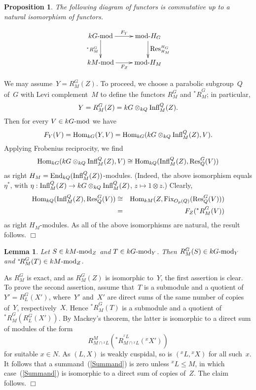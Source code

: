 \documentclass[twoside,12pt]{amsart}
\theoremstyle{plain}
\newenvironment{prf}{{\bf Proof.}}{\hfill $\Box$ \\[-1.0ex]}
\newtheorem{lem}[num]{Lemma}
\newtheorem{prp}[num]{Proposition}
\begin{document}
\begin{prp}
\label{HCRestricitonAndRestriction}
The following diagram of functors is commutative up to a natural
isomorphism of functors.

$$
\begin{xy}
\xymatrix{
kG\mbox{\rm -mod} \ar[r]^{F_Y} \ar[d]_{{^*R}_M^G} & \mbox{\rm mod-}H_G \ar[d]^{{\mbox{\rm Res}}^{H_G}_{H_M}} \\
kM\mbox{\rm -mod} \ar[r]_{F_Z} & \mbox{\rm mod-}H_M
}
\end{xy}
$$
\end{prp}
\begin{prf}
We may assume~$Y = R_M^G(Z)$. To proceed, we choose a parabolic subgroup~$Q$
of~$G$ with Levi complement~$M$ to define the functors $R_M^G$ and ${^*R}_M^G$; 
in particular,
$$Y = R_M^G(Z) = kG \otimes_{kQ} {\mbox{\rm Infl}}_M^Q( Z ).$$
Then for every $V \in kG\mbox{\rm -mod}$ we have
$$F_Y(V) = {\mbox{\rm Hom}}_{kG}( Y, V ) = {\mbox{\rm Hom}}_{kG}( kG \otimes_{kQ} {\mbox{\rm Infl}}_M^Q( Z ), V ).$$
Applying Frobenius reciprocity, we find
$${\mbox{\rm Hom}}_{kG}( kG \otimes_{kQ} {\mbox{\rm Infl}}_M^Q( Z ), V ) \cong
{\mbox{\rm Hom}}_{kQ}( {\mbox{\rm Infl}}_M^Q( Z ), {\mbox{\rm Res}}^G_Q( V ) )$$
as right $H_M = {\mbox{\rm End}}_{kQ}( {\mbox{\rm Infl}}_M^Q( Z ) )$-modules. (Indeed, the above
isomorphism equals $\eta^*$, with $\eta : {\mbox{\rm Infl}}_M^Q( Z ) 
\rightarrow kG \otimes_{kQ} {\mbox{\rm Infl}}_M^Q( Z )$, $z \mapsto 1 \otimes z$.)
Clearly, 
\begin{eqnarray*} {\mbox{\rm Hom}}_{kQ}( {\mbox{\rm Infl}}_M^Q( Z ), {\mbox{\rm Res}}^G_Q( V ) ) & \cong & 
{\mbox{\rm Hom}}_{kM}( Z , {\mbox{\rm Fix}}_{O_p(Q)}( {\mbox{\rm Res}}^G_Q( V ) ) ) \\
& = & F_Z( {^*R}_M^G( V ) )
\end{eqnarray*}
as right $H_M$-modules. As all of the above isomorphisms are natural,
the result follows.
\end{prf}

\begin{lem}
\label{modYstability}
Let $S \in kM\mbox{\rm -mod}_Z$ and $T \in kG\mbox{\rm -mod}_Y$.
Then $R_M^G(S) \in kG\mbox{\rm -mod}_Y$ and ${^*\!R}_M^G(T) \in 
kM\mbox{\rm -mod}_Z$.
\end{lem}
\begin{prf}
As $R_M^G$ is exact, and as $R_M^G(Z)$ is isomorphic to~$Y$, the first assertion 
is clear. To prove the second assertion, assume that~$T$ is a submodule and a 
quotient of $Y' = R_L^G(X')$, where~$Y'$ and~$X'$ are direct sums of the same 
number of copies of~$Y$, respectively~$X$. Hence ${^*\!R}_M^G(T)$ is a submodule 
and a quotient of ${^*\!R}_M^G( R_L^G(X') )$. By Mackey's theorem, the latter is 
isomorphic to a direct sum of modules of the form
\begin{equation}
\label{Summand}
R_{M \cap {^x\!L}}^M ( {^*\!R}_{M \cap {^x\!L}}^{^x\!L}( {^x\!X'} ) )
\end{equation}
for suitable $x\in N$. As $(L,X)$ is weakly cuspidal, so is $({^x\!L},{^x\!X})$
for all such~$x$. It follows that a summand~(\ref{Summand}) is zero unless 
${^x\!L} \leq M$, in which case~(\ref{Summand}) is isomorphic to a direct sum 
of copies of~$Z$. The claim follows.
\end{prf}
\end{document}
